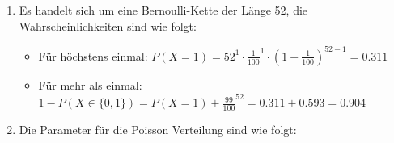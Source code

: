 \begin{enumerate}
	\item Es handelt sich um eine Bernoulli-Kette der Länge 52, die Wahrscheinlichkeiten sind wie folgt:
	\begin{itemize}
		\item Für höchstens einmal: $P(X=1)= 52^1 \cdot \frac{1}{100}^1 \cdot (1-\frac{1}{100})^{52-1}=0.311$
		\item Für mehr als einmal: $1-P(X \in \{ 0, 1 \}) = P(X=1) + \frac{99}{100}^{52} =0.311 + 0.593 = 0.904 $
	\end{itemize}

	\item Die Parameter für die Poisson Verteilung sind wie folgt:
\end{enumerate} 
